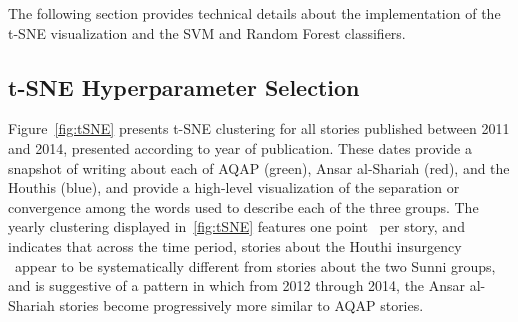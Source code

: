 The following section provides technical details about the
implementation of the t-SNE visualization and the SVM and Random Forest
classifiers.

\subsection{t-SNE Hyperparameter Selection}

Figure~\ref{fig:tSNE}
presents t-SNE clustering for all stories published between 2011 and
2014, presented according to year of publication. These dates provide
a snapshot of writing about each of AQAP (green), Ansar al-Shariah
(red), and the Houthis (blue), and provide a high-level visualization
of the separation or convergence among the words used to describe each
of the three groups. The yearly clustering displayed in~\ref{fig:tSNE} features one point \
per story, and indicates that across the time period, stories about the Houthi insurgency \
appear to be systematically different from stories about the two Sunni groups,
and is suggestive of a pattern in which from 2012 through 2014, the
Ansar al-Shariah stories become progressively more similar to AQAP
stories.


